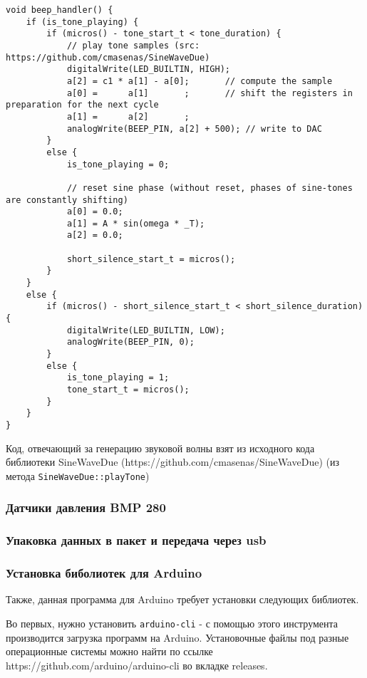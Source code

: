 \documentclass[../main.tex]{subfiles}
\begin{document}
\begin{lstlisting}
void beep_handler() {
    if (is_tone_playing) {
        if (micros() - tone_start_t < tone_duration) {
            // play tone samples (src: https://github.com/cmasenas/SineWaveDue)
            digitalWrite(LED_BUILTIN, HIGH);
            a[2] = c1 * a[1] - a[0];       // compute the sample
            a[0] =      a[1]       ;       // shift the registers in preparation for the next cycle
            a[1] =      a[2]       ;
            analogWrite(BEEP_PIN, a[2] + 500); // write to DAC
        }
        else {
            is_tone_playing = 0;

            // reset sine phase (without reset, phases of sine-tones are constantly shifting)
            a[0] = 0.0;
            a[1] = A * sin(omega * _T);
            a[2] = 0.0;

            short_silence_start_t = micros();
        }
    }
    else {
        if (micros() - short_silence_start_t < short_silence_duration) {
            digitalWrite(LED_BUILTIN, LOW);
            analogWrite(BEEP_PIN, 0);
        }
        else {
            is_tone_playing = 1;
            tone_start_t = micros();
        }
    }
}
\end{lstlisting}


Код, отвечающий за генерацию звуковой волны взят из исходного кода библиотеки SineWaveDue (https://github.com/cmasenas/SineWaveDue) (из метода \texttt{SineWaveDue::playTone})

\subsubsection{Датчики давления BMP 280}
\subsubsection{Упаковка данных в пакет и передача через usb}
\subsubsection{Установка биболиотек для Arduino}

Также, данная программа для Arduino требует установки следующих библиотек. 

Во первых, нужно установить \texttt{arduino-cli} - с помощью этого инструмента производится загрузка программ на Arduino. Установочные файлы под разные операционные системы можно найти по ссылке https://github.com/arduino/arduino-cli во вкладке releases.
\end{document}
